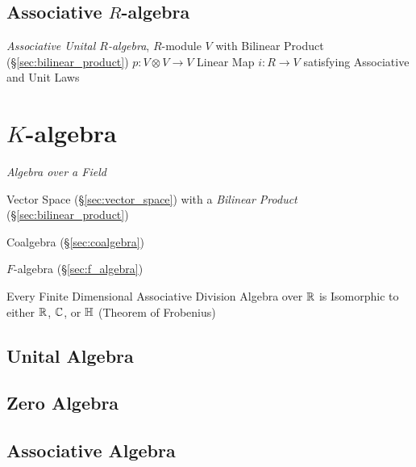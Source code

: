 \subsection{Associative $R$-algebra}\label{sec:associative_r_algebra}

\emph{Associative Unital $R$-algebra}, $R$-module $V$ with Bilinear
Product (\S\ref{sec:bilinear_product}) $p : V \otimes V \rightarrow V$
Linear Map $i : R \rightarrow V$ satisfying Associative and Unit Laws



\section{$K$-algebra}\label{sec:k_algebra}

\emph{Algebra over a Field}

Vector Space (\S\ref{sec:vector_space}) with a \emph{Bilinear Product}
(\S\ref{sec:bilinear_product})

Coalgebra (\S\ref{sec:coalgebra})

$F$-algebra (\S\ref{sec:f_algebra})

Every Finite Dimensional Associative Division Algebra over $\mathbb{R}$ is
Isomorphic to either $\mathbb{R}$, $\mathbb{C}$, or $\mathbb{H}$ (Theorem of
Frobenius) %



\subsection{Unital Algebra}\label{sec:unital_algebra}

\subsection{Zero Algebra}\label{sec:zero_algebra}

\subsection{Associative Algebra}\label{sec:associative_algebra}

